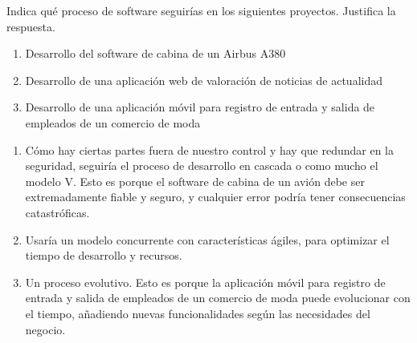 

\begin{enunciado}
    Indica qué proceso de software seguirías en los siguientes proyectos.
    Justifica la respuesta.
    \begin{enumerate}
        \item Desarrollo del software de cabina de un Airbus A380
        \item Desarrollo de una aplicación web de valoración de noticias de actualidad
        \item Desarrollo de una aplicación móvil para registro de entrada y salida de empleados de un comercio de moda
    \end{enumerate}
\end{enunciado}

\begin{solucion}
    \begin{enumerate}
        \item Cómo hay ciertas partes fuera de nuestro control y hay que redundar en la seguridad,
        seguiría el proceso de desarrollo en cascada o como mucho el modelo V.
        Esto es porque el software de cabina de un avión debe ser extremadamente fiable y seguro, y cualquier error podría tener consecuencias catastróficas.
        \item Usaría un modelo concurrente con características ágiles, para optimizar el tiempo de desarrollo y recursos.
        \item Un proceso evolutivo.
        Esto es porque la aplicación móvil para registro de entrada y salida de empleados de un comercio de moda puede evolucionar con el tiempo, añadiendo nuevas funcionalidades según las necesidades del negocio.
    \end{enumerate}
\end{solucion}
